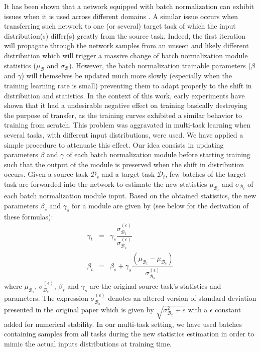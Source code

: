 It has been shown that a network equipped with batch normalization \parencite{ioffe2015batch} can exhibit issues when it is used across different domains \parencite{li2018adaptive, chang2019domain}. A similar issue occurs when transferring such network to one (or several) target task of which the input distribution(s) differ(s) greatly from the source task. Indeed, the first iteration will propagate through the network samples from an unseen and likely different distribution which will trigger a massive change of batch normalization module statistics ($\mu_\mathcal{B}$ and $\sigma_\mathcal{B}$). However, the batch normalization trainable parameters ($\beta$ and $\gamma$) will themselves be updated much more slowly (especially when the training learning rate is small) preventing them to adapt properly to the shift in distribution and statistics. In the context of this work, early experiments have shown that it had a undesirable negative effect on training basically destroying the purpose of transfer, as the training curves exhibited a similar behavior to training from scratch. This problem was aggravated in multi-task learning when several tasks, with different input distributions, were used. We have applied a simple procedure to attenuate this effect. Our idea consists in updating parameters $\beta$ and $\gamma$ of each batch normalization module before starting training such that the output of the module is preserved when the shift in distribution occurs. Given a source task $\mathcal{D}_s$ and a target task $\mathcal{D}_t$, few batches of the target task are forwarded into the network to estimate the new statistics $\mu_{\mathcal{B}_t}$ and $\sigma_{\mathcal{B}_t}$ of each batch normalization module input. Based on the obtained statistics, the new parameters $\beta_s$ and $\gamma_s$ for a module are given by (see below for the derivation of these formulas):
\begin{eqnarray}
\gamma_t &=& \gamma_s \dfrac{\sigma^{(\epsilon)}_{\mathcal{B}_t}}{\sigma^{(\epsilon)}_{\mathcal{B}_s}}\label{app:mtask:eqn:bn_update_gamma}\\
\beta_t &=& \beta_s + \gamma_s  \dfrac{(\mu_{\mathcal{B}_t}-\mu_{\mathcal{B}_s})}{\sigma^{(\epsilon)}_{\mathcal{B}_s}}\label{app:mtask:eqn:bn_update_beta}
\end{eqnarray}
where $\mu_{\mathcal{B}_s}$, $\sigma^{(\epsilon)}_{\mathcal{B}_s}$, $\beta_s$ and $\gamma_s$ are the original source task's statistics and parameters. The expression $\sigma^{(\epsilon)}_{\mathcal{B}_x}$ denotes an altered version of standard deviation presented in the original paper which is given by $\sqrt{\sigma_{\mathcal{B}_x}^2 + \epsilon}$ with a $\epsilon$ constant added for numerical stability. In our multi-task setting, we have used batches containing samples from all tasks during the new statistics estimation in order to mimic the actual inputs distributions at training time.

